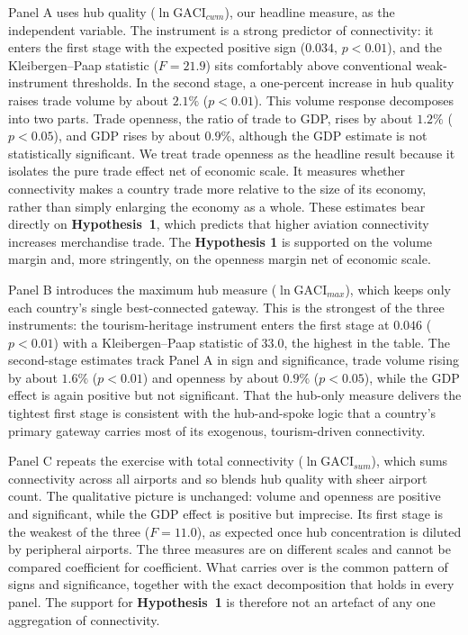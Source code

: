 Panel A uses hub quality ($\ln\mathrm{GACI}_{cwm}$), our headline measure, as the independent variable. The
instrument is a strong predictor of connectivity: it enters the first stage with
the expected positive sign ($0.034$, $p<0.01$), and the Kleibergen--Paap statistic ($F=21.9$) sits comfortably above conventional weak-instrument
thresholds. In the second stage, a one-percent increase in hub quality raises trade volume by about $2.1\%$ ($p<0.01$). This volume response decomposes into two
parts. Trade openness, the ratio of trade to GDP, rises by about $1.2\%$ ($p<0.05$), and GDP rises by about $0.9\%$, although the GDP estimate is not
statistically significant. We treat trade openness as the headline result because
it isolates the pure trade effect net of economic scale. It measures whether
connectivity makes a country trade more relative to the size of its economy,
rather than simply enlarging the economy as a whole. These estimates bear
directly on \textbf{Hypothesis~1}, which predicts that higher aviation connectivity
increases merchandise trade. The \textbf{Hypothesis 1} is supported on the volume margin
and, more stringently, on the openness margin net of economic scale.

Panel B introduces the maximum hub measure ($\ln\mathrm{GACI}_{max}$), which keeps
only each country's single best-connected gateway. This is the strongest of the
three instruments: the tourism-heritage instrument enters the first stage at $0.046$ ($p<0.01$) with a Kleibergen--Paap statistic of $33.0$, the highest in the
table. The second-stage estimates track Panel A in sign and significance, trade volume rising by about $1.6\%$ ($p<0.01$) and openness by about $0.9\%$ ($p<0.05$), while the GDP effect is again positive but not significant. That the
hub-only measure delivers the tightest first stage is consistent with the
hub-and-spoke logic that a country's primary gateway carries most of its
exogenous, tourism-driven connectivity.

Panel C repeats the exercise with total connectivity ($\ln\mathrm{GACI}_{sum}$),
which sums connectivity across all airports and so blends hub quality with sheer
airport count. The qualitative picture is unchanged: volume and openness are
positive and significant, while the GDP effect is positive but imprecise. Its
first stage is the weakest of the three ($F=11.0$), as expected once hub
concentration is diluted by peripheral airports. The three measures are on
different scales and cannot be compared coefficient for coefficient. What carries
over is the common pattern of signs and significance, together with the exact
decomposition that holds in every panel. The support for \textbf{Hypothesis~1} is
therefore not an artefact of any one aggregation of connectivity.

